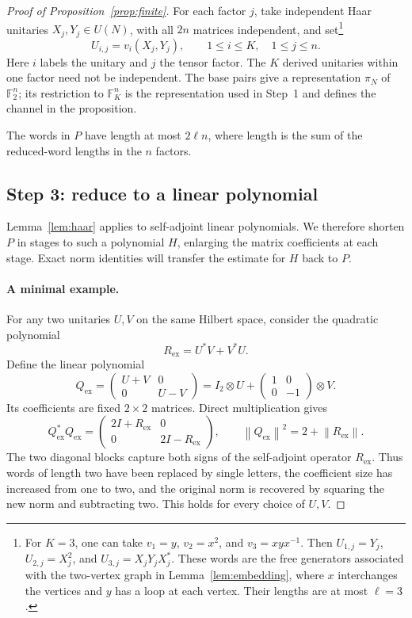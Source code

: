 \documentclass[11pt]{article}
\numberwithin{equation}{section}
\theoremstyle{boldremark}\newtheorem{remark}[theorem]{Remark}
\newcommand{\F}{\mathbb F}
\newcommand{\norm}[1]{\left\lVert #1\right\rVert}
\begin{document}
\begin{proof}[Proof of Proposition~\ref{prop:finite}]
For each factor $j$, take independent Haar unitaries $X_j,Y_j\in U(N)$,
with all $2n$ matrices independent, and set\footnote{For $K=3$, one
can take $v_1=y$, $v_2=x^2$, and $v_3=xyx^{-1}$. Then
$U_{1,j}=Y_j$, $U_{2,j}=X_j^2$, and $U_{3,j}=X_jY_jX_j^*$.
These words are the free generators associated with the two-vertex
graph in Lemma~\ref{lem:embedding}, where $x$ interchanges the
vertices and $y$ has a loop at each vertex. Their lengths are at most
$\ell=3$.}
\[
 U_{i,j}=v_i(X_j,Y_j),\qquad 1\le i\le K,\quad 1\le j\le n.
\]
Here $i$ labels the unitary and $j$ the tensor factor. The $K$ derived
unitaries within one factor need not be independent. The base pairs
give a representation $\pi_N$ of $\F_2^n$;
its restriction to $\F_K^n$ is the representation used in
Step~1 and defines the channel in the proposition.

The words in $P$ have length at most $2\ell n$, where length is the sum
of the reduced-word lengths in the $n$ factors.

\subsection{Step 3: reduce to a linear polynomial}
\label{sec:degree-reduction}

Lemma~\ref{lem:haar} applies to self-adjoint linear polynomials.
We therefore shorten $P$ in stages to such a polynomial $H$, enlarging
the matrix coefficients at each stage. Exact norm identities will
transfer the estimate for $H$ back to $P$.

\paragraph{A minimal example.}
For any two unitaries $U,V$ on the same Hilbert space, consider
the quadratic polynomial
\[
 R_{\mathrm{ex}}=U^*V+V^*U.
\]
Define the linear polynomial
\[
 Q_{\mathrm{ex}}
 =\begin{pmatrix}U+V&0\\0&U-V\end{pmatrix}
 =I_2\otimes U+\begin{pmatrix}1&0\\0&-1\end{pmatrix}\otimes V.
\]
Its coefficients are fixed $2\times2$ matrices. Direct multiplication gives
\[
 Q_{\mathrm{ex}}^*Q_{\mathrm{ex}}
 =\begin{pmatrix}2I+R_{\mathrm{ex}}&0\\0&2I-R_{\mathrm{ex}}\end{pmatrix},
 \qquad
 \norm{Q_{\mathrm{ex}}}^2=2+\norm{R_{\mathrm{ex}}}.
\]
The two diagonal blocks capture both signs of the self-adjoint
operator $R_{\mathrm{ex}}$. Thus words of length two have been replaced
by single letters, the coefficient size has increased from one to two,
and the original norm is recovered by squaring the new norm and
subtracting two. This holds for every choice of $U,V$.


\end{proof}
\end{document}
